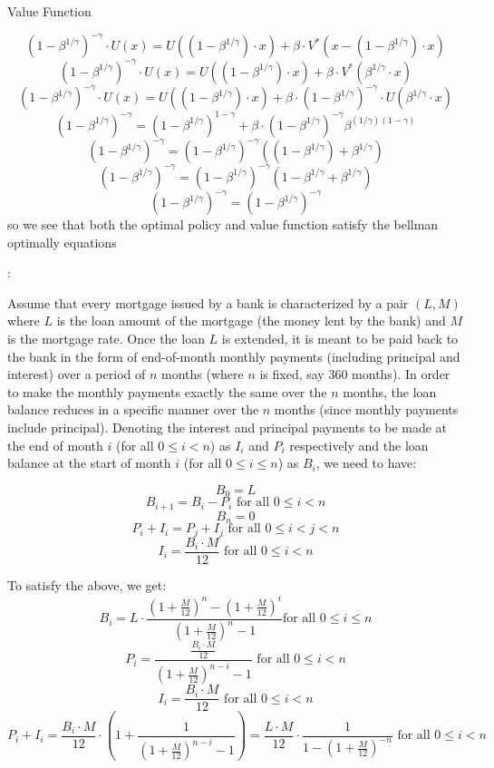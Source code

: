 \documentclass[12pt]{exam}
\begin{document}
\begin{questions}
\begin{itemize}
\begin{solution}
    Value Function
    
    \[(1-\beta^{1/\gamma})^{-\gamma} \cdot U(x) = U((1 - \beta^{1/\gamma}) \cdot x) + \beta \cdot V^*(x - (1 - \beta^{1/\gamma}) \cdot x)\]
    \[(1-\beta^{1/\gamma})^{-\gamma} \cdot U(x) = U((1 - \beta^{1/\gamma}) \cdot x) + \beta \cdot V^*(\beta^{1/\gamma} \cdot x)\]
    \[(1-\beta^{1/\gamma})^{-\gamma}\cdot U(x) = U((1 - \beta^{1/\gamma}) \cdot x) + \beta \cdot (1-\beta^{1/\gamma})^{-\gamma} \cdot U(\beta^{1/\gamma} \cdot x)\]
    \[(1-\beta^{1/\gamma})^{-\gamma} = (1 - \beta^{1/\gamma})^{1-\gamma} + \beta \cdot (1-\beta^{1/\gamma})^{-\gamma} \beta^{(1/\gamma)(1-\gamma)}\]
    \[(1-\beta^{1/\gamma})^{-\gamma} = (1 - \beta^{1/\gamma})^{-\gamma}((1 - \beta^{1/\gamma}) + \beta^{1/\gamma})\]
    \[(1-\beta^{1/\gamma})^{-\gamma} = (1 - \beta^{1/\gamma})^{-\gamma}(1 - \beta^{1/\gamma} + \beta^{1/\gamma})\]
    \[(1-\beta^{1/\gamma})^{-\gamma} = (1 - \beta^{1/\gamma})^{-\gamma}\]
    so we see that both the optimal policy and value function satisfy the bellman optimally equations
\end{solution}
\end{itemize}

\newpage
{}:

Assume that every mortgage issued by a bank is characterized by a pair $(L, M)$ where $L$ is the loan amount of the mortgage (the money lent by the bank) and $M$ is the mortgage rate. Once the loan $L$ is extended, it is meant to be paid back to the bank in the form of end-of-month monthly payments (including principal and interest) over a period of $n$ months (where $n$ is fixed, say 360 months). In order to make the monthly payments exactly the same over the $n$ months, the loan balance reduces in a specific manner over the $n$ months (since monthly payments include principal). Denoting the interest and principal payments to be made at the end of month $i$ (for all $0 \leq i < n$) as $I_i$ and $P_i$ respectively and the loan balance at the start of month $i$ (for all $0 \leq i \leq n$) as $B_i$, we need to have:

$$B_0 = L$$
$$B_{i+1} = B_i - P_i \text{ for all } 0 \leq i < n$$
$$B_n = 0$$
$$P_i + I_i = P_j + I_j \text{ for all } 0 \leq i < j < n$$
$$I_i = \frac {B_i \cdot M} {12} \text{ for all } 0 \leq i < n$$

To satisfy the above, we get:
$$B_i = L \cdot \frac {(1 + \frac M {12})^n - (1 + \frac M {12})^i} {(1 + \frac M {12})^n - 1} \text{for all } 0 \leq i \leq n$$
$$P_i = \frac {\frac {B_i \cdot M} {12}} {(1 + \frac M {12})^{n - i} - 1} \text{ for all } 0 \leq i < n$$
$$I_i = \frac {B_i \cdot M} {12} \text{ for all } 0 \leq i < n$$
$$P_i + I_i = \frac {B_i \cdot M} {12} \cdot (1 + \frac 1 {(1 + \frac M {12})^{n - i} - 1}) =  \frac {L \cdot M} {12} \cdot \frac 1 {1 - (1 + \frac M {12})^{-n}} \text{ for all } 0 \leq i < n$$ 


\end{questions}
\end{document}
